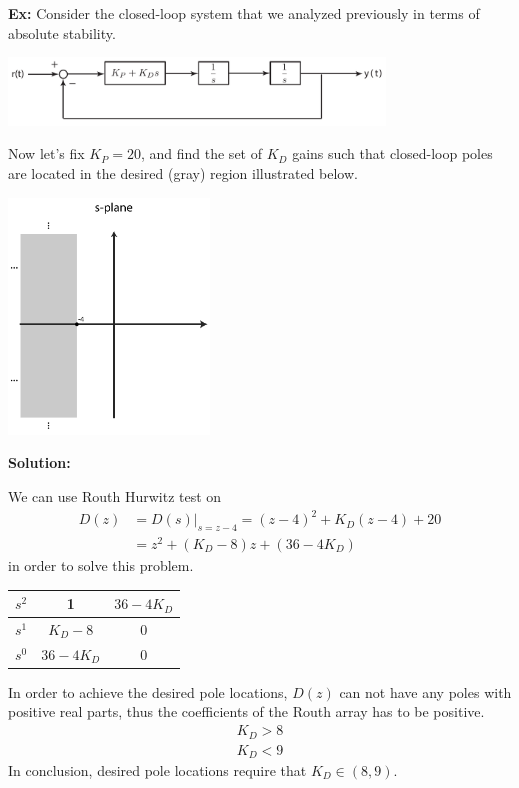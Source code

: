 \documentclass[twoside]{article}
\begin{document}
\textbf{Ex:} Consider the closed-loop system that we analyzed
previously in terms of absolute stability. 

  \begin{minipage}[h]{1\linewidth}
    \begin{center}
      \includegraphics[width=0.75\textwidth]{example2}
    \end{center}
  \end{minipage}

Now let's fix $K_P = 20$, and find the 
set of $K_D$ gains such that closed-loop poles
are located in the desired (gray) region illustrated below.

  \begin{minipage}[h]{1\linewidth}
    \begin{center}
      \includegraphics[width=0.4\textwidth]{settling}
    \end{center}
  \end{minipage}

\textbf{Solution:}

We can use Routh Hurwitz test on 
%
\begin{align*}
  D(z)  &= D(s)|_{s = z- 4} = (z-4)^2 + K_D (z-4) + 20
\\
&=  z^2 + (K_D - 8) z + (36 - 4 K_D)
\end{align*}
%
in order to solve this problem. 
%
\begin{table}[h]
\begin{center}
\begin{tabular}{|c || c || c  |}
\hline
$s^2$ & 1 & $36- 4 K_D$ 
\\ \hline
$s^1$ & $K_D - 8$ & 0 
\\ \hline
$s^0$ & $36- 4 K_D$ & 0 
\\ \hline
\end{tabular}
\end{center}
\end{table}
%
In order to achieve the desired pole locations, $D(z)$
can not have any poles with positive real parts, thus
the coefficients of the Routh array has to be positive.
%
\begin{align*}
  K_D > 8
  \\
  K_D < 9
\end{align*}
%
In conclusion, desired pole locations require that 
$K_D \in (8 , 9)$.



\end{document}
